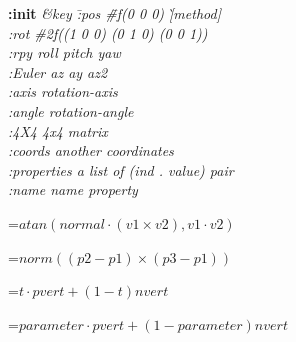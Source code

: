 {\newpage
\clearpage
\samepage 
\begin{emtabbing}{\bf :init} 
\it \&key \= :pos \hspace{8mm} \= \#f(0 0 0)
 \`[method] \\  
 \> :rot \> \#2f((1 0 0) (0 1 0) (0 0 1)) \\  
 \> :rpy \> roll pitch yaw \\  
 \> :Euler \> az ay az2 \\  
 \> :axis \>  rotation-axis \\  
 \> :angle \> rotation-angle \\  
 \> :4X4   \> 4x4 matrix \\  
 \> :coords \> another coordinates \\  
 \> :properties \>  a list of (ind . value) pair \\  
 \> :name \> name property \\  
\rm
\end{emtabbing}
}

{\newpage
\clearpage
\samepage 
}

{\newpage
\clearpage
\samepage 
\begin{figure}\begin{center}
\end{center}

\end{figure}
}

{\newpage
\clearpage
\samepage 
\setbox\sizebox=\hbox{$atan(normal \cdot (v1 \times v2), v1 \cdot v2)$}\box\sizebox
}

{\newpage
\clearpage
\samepage 
\setbox\sizebox=\hbox{$norm((p2-p1) \times (p3-p1))$}\box\sizebox
}

{\newpage
\clearpage
\samepage 
\setbox\sizebox=\hbox{$t \cdot pvert +(1-t)nvert $}\box\sizebox
}

{\newpage
\clearpage
\samepage 
\setbox\sizebox=\hbox{$parameter \cdot pvert + (1-parameter)nvert$}\box\sizebox
}


